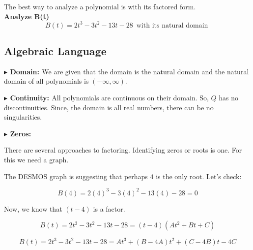 \documentclass{ximera}
\author{Lee Wayand}
\begin{document}
\begin{exercise}



The best way to analyze a polynomial is with its factored form. \\


\textbf{Analyze B(t)} \\

\[
B(t) = 2 t^3 - 3 t^2 - 13 t - 28 \, \text { with its natural domain } 
\]






\subsection*{Algebraic Language}



\textbf{\textcolor{blue!55!black}{$\blacktriangleright$ Domain: }} We are given that the domain is the natural domain and the natural domain of all polynomials is $(-\infty, \infty)$.


\textbf{\textcolor{blue!55!black}{$\blacktriangleright$ Continuity: }}  All polynomials are continuous on their domain.  So, $Q$ has no discontinuities.  Since, the domain is all real numbers, there can be no singularities.



\textbf{\textcolor{blue!55!black}{$\blacktriangleright$ Zeros: }}  


There are several approaches to factoring.  Identifying zeros or roots is one.  For this we need a graph.




\begin{center}
\end{center}



The DESMOS graph is suggesting that perhaps $4$ is the only root.  Let's check:



\[
B(4) = 2 (4)^3 - 3 (4)^2 - 13 (4) - 28 = 0
\]




Now, we know that $(t-4)$ is a factor.  




\[
B(t) = 2 t^3 - 3 t^2 - 13 t - 28 = (t-4)(A t^2 + B t + C)
\]




\[
B(t) = 2 t^3 - 3 t^2 - 13 t - 28 = A t^3 + (B - 4 A) t^2 + (C - 4 B) t - 4 C 
\]



\end{exercise}
\end{document}
